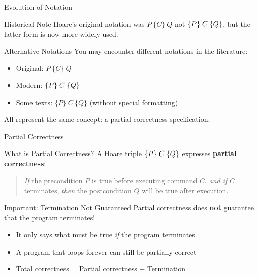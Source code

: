 \begin{frame}{Evolution of Notation}
    \begin{block}{Historical Note}
        Hoare's original notation was $P\ \{C\}\ Q$ not $\{P\}\; C\; \{Q\}$, but the latter form is now more widely used.
    \end{block}
    
    \begin{block}{Alternative Notations}
        You may encounter different notations in the literature:
        \begin{itemize}
            \item Original: $P\ \{C\}\ Q$
            \item Modern: $\{P\}\; C\; \{Q\}$
            \item Some texts: $\{P\}\ C\ \{Q\}$ (without special formatting)
        \end{itemize}
        All represent the same concept: a partial correctness specification.
    \end{block}
\end{frame}

\begin{frame}{Partial Correctness}
    \begin{block}{What is Partial Correctness?}
        A Hoare triple $\{P\}\; C\; \{Q\}$ expresses \textbf{partial correctness}:
        \begin{quote}
            \emph{If} the precondition $P$ is true before executing command $C$, \emph{and if} $C$ terminates, \emph{then} the postcondition $Q$ will be true after execution.
        \end{quote}
    \end{block}
    
    \begin{alertblock}{Important: Termination Not Guaranteed}
        Partial correctness does \textbf{not} guarantee that the program terminates!
        \begin{itemize}
            \item It only says what must be true \emph{if} the program terminates
            \item A program that loops forever can still be partially correct
            \item Total correctness = Partial correctness + Termination
        \end{itemize}
    \end{alertblock}
\end{frame}

